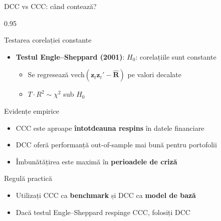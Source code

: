 \documentclass[9pt, aspectratio=169, t]{beamer}
\begin{document}
\begin{frame}{DCC vs CCC: când contează?}
    \begin{cminipage}{0.95\textwidth}
    {\footnotesize
    \begin{block}{Testarea corelației constante}
        \begin{itemize}\setlength{\itemsep}{0pt}
            \item \textbf{Testul Engle--Sheppard (2001)}: $H_0$: corelațiile sunt constante
                \begin{itemize}\setlength{\itemsep}{0pt}
                    \item Se regresează $\text{vech}(\mathbf{z}_t\mathbf{z}_t' - \hat{\mathbf{R}})$ pe valori decalate
                    \item $T \cdot R^2 \sim \chi^2$ sub $H_0$
                \end{itemize}
        \end{itemize}
    \end{block}
    \begin{block}{Evidențe empirice}
        \begin{itemize}\setlength{\itemsep}{0pt}
            \item CCC este aproape \textbf{întotdeauna respins} în datele financiare
            \item DCC oferă performanță out-of-sample mai bună pentru portofolii
            \item Îmbunătățirea este maximă în \textbf{perioadele de criză}
        \end{itemize}
    \end{block}
    \begin{alertblock}{Regulă practică}
        \begin{itemize}\setlength{\itemsep}{0pt}
            \item Utilizați CCC ca \textbf{benchmark} și DCC ca \textbf{model de bază}
            \item Dacă testul Engle--Sheppard respinge CCC, folosiți DCC
        \end{itemize}
    \end{alertblock}
    }
    \end{cminipage}
\end{frame}
\end{document}
